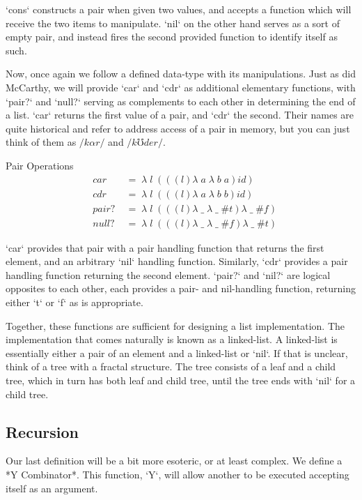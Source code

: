 `cons` constructs a pair when given two values, and accepts a function which will 
receive the two items to manipulate. `nil` on the other hand serves as a sort of 
empty pair, and instead fires the second provided function to identify itself as 
such.

Now, once again we follow a defined data-type with its manipulations. Just as did 
McCarthy, we will provide `car` and `cdr` as additional elementary functions, with 
`pair?` and `null?` serving as complements to each other in determining the end of 
a list. `car` returns the first value of a pair, and `cdr` the second. Their names 
are quite historical and refer to address access of a pair in memory, but you can 
just think of them as $/k \alpha r/$ and $/k \mho d e r/$.

Pair Operations
\begin{align*}
& car \; &= \; \lambda \; l \; (((l)\lambda \; a \; \lambda \; b \; a)id)
\\& cdr \; &= \; \lambda \; l \; (((l)\lambda \; a \; \lambda \; b \; b)id)
\\& pair? \; &= \; \lambda \; l \; (((l)\lambda \; \_ \; \lambda \; \_ \; \#t)\lambda \; \_ \; \#f)
\\& null? \; &= \; \lambda \; l \; (((l)\lambda \; \_ \; \lambda \; \_ \; \#f)\lambda \; \_ \; \#t)
\end{align*}

`car` provides that pair with a pair handling function that returns the first 
element, and an arbitrary `nil` handling function. Similarly, `cdr` provides a 
pair handling function returning the second element. `pair?` and `nil?` are 
logical opposites to each other, each provides a pair- and nil-handling function, 
returning either `t` or `f` as is appropriate.

Together, these functions are sufficient for designing a list implementation. The 
implementation that comes naturally is known as a linked-list. A linked-list is 
essentially either a pair of an element and a linked-list or `nil`. If that is 
unclear, think of a tree with a fractal structure. The tree consists of a leaf and 
a child tree, which in turn has both leaf and child tree, until the tree ends with 
`nil` for a child tree.

\subsection{Recursion}
Our last definition will be a bit more esoteric, or at least complex. We define a 
*Y Combinator*. This function, `Y`, will allow another to be executed accepting 
itself as an argument.

